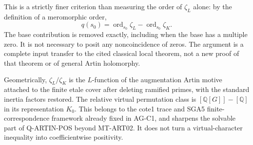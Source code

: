 This is a strictly finer criterion than measuring the order
of $\zeta_L$ alone: by the definition of a meromorphic order,
\[
 q(s_0)=\operatorname{ord}_{s_0}\zeta_L
                 -\operatorname{ord}_{s_0}\zeta_K.
\]
The base contribution is removed exactly, including when the
base has a multiple zero. It is not necessary to posit any
noncoincidence of zeros. The argument is a complete input
transfer to the cited classical local theorem, not a new proof
of that theorem or of general Artin holomorphy.

Geometrically, $\zeta_L/\zeta_K$ is the $L$-function of the
augmentation Artin motive attached to the finite etale cover
after deleting ramified primes, with the standard inertia
factors restored. The relative virtual permutation class is
$[\mathbb Q[G]]-[\mathbb Q]$ in its representation $K_0$.
This belongs to the cote1 trace and SGA5 finite-correspondence
framework already fixed in AG-C1, and sharpens the
solvable part of Q-ARTIN-POS beyond MT-ART02. It does not turn a
virtual-character inequality into coefficientwise positivity.

